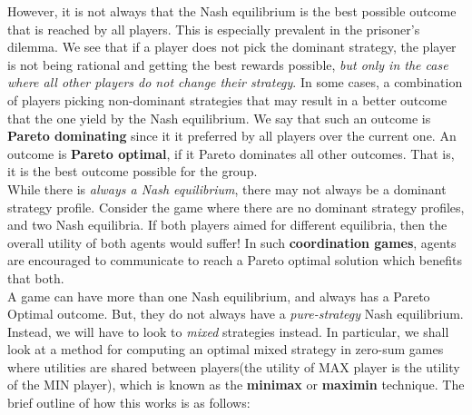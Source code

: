 \documentclass[11pt]{article}
\begin{document}
However, it is not always that the Nash equilibrium is the best possible outcome that is reached by all players. This is especially prevalent in the prisoner's dilemma. We see that if a player does not pick the dominant strategy, the player is not being rational and getting the best rewards possible, \textit{but only in the case where all other players do not change their strategy}. In some cases, a combination of players picking non-dominant strategies that may result in a better outcome that the one yield by the Nash equilibrium. We say that such an outcome is \textbf{Pareto dominating} since it it preferred by all players over the current one. An outcome is \textbf{Pareto optimal}, if it Pareto dominates all other outcomes. That is, it is the best outcome possible for the group.\\

While there is \textit{always a Nash equilibrium}, there may not always be a dominant strategy profile. Consider the game where there are no dominant strategy profiles, and two Nash equilibria. If both players aimed for different equilibria, then the overall utility of both agents would suffer! In such \textbf{coordination games}, agents are encouraged to communicate to reach a Pareto optimal solution which benefits that both.\\

A game can have more than one Nash equilibrium, and always has a Pareto Optimal outcome. But, they do not always have a \textit{pure-strategy} Nash equilibrium. Instead, we will have to look to \textit{mixed} strategies instead. In particular, we shall look at a method for computing an optimal mixed strategy in zero-sum games where utilities are shared between players(the utility of MAX player is the utility of the MIN player), which is known as the \textbf{minimax} or \textbf{maximin} technique. The brief outline of how this works is as follows:
\end{document}
